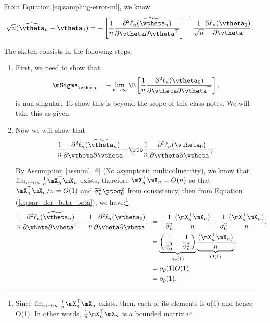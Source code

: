 \documentclass[english,12pt]{book}\usepackage[]{graphicx}\usepackage[]{xcolor}
\begin{document}
\begin{subappendices}
From Equation \eqref{eq:sampling-error-ml}, we know
\begin{equation*}
  \sqrt{n}(\widehat{\vtheta}_n - \vtheta_0) = - \left[\frac{1}{n}\frac{\partial^2 \ell_n(\widetilde{\vtheta}_n)}{\partial \vtheta \partial \vtheta^\top}\right]^{-1}\frac{1}{\sqrt{n}}\frac{\partial \ell_n(\vtheta_0)}{\partial \vtheta}.
\end{equation*}

The sketch consists in the following steps: 
\begin{enumerate}
  \item First, we need to show that:
    \begin{equation*}
    \mSigma_{\vtheta} = - \lim_{n\to\infty} \E\left[\frac{1}{n}\frac{\partial^2 \ell_n(\vtheta_0)}{\partial \vtheta \partial \vtheta^\top}\right],
    \end{equation*}
    is non-singular. To show this is beyond the scope of this class notes. We will take this as given. 
  \item Now we will show that 
   \begin{equation*}
    \frac{1}{n}\frac{\partial^2 \ell_n(\widetilde{\vtheta}_n)}{\partial \vtheta \partial \vtheta^\top}\pto \frac{1}{n}\frac{\partial^2 \ell_n(\vtheta_0)}{\partial \vtheta \partial \vtheta^\top}
   \end{equation*}
   
   By Assumption \ref{assu:ml_6} (No asymptotic multicolinearity), we know that  $\lim_{n\to\infty}\frac{1}{n}\mX_n^\top\mX_n$ exists, therefore $\mX_n^\top\mX_n = O(n)$ so that $\mX_n^\top\mX_n/n = O(1)$ and $\widetilde{\sigma}^2_n\pto \sigma_0^2$ from consistency, then from Equation (\ref{eq:sar_der_beta_beta}), we have:\footnote{Since $\lim_{n\to\infty}\frac{1}{n}\mX_n^\top\mX_n$ exists, then, each of its elements is o(1) and hence O(1). In other words, $\frac{1}{n}\mX_n^\top\mX_n$ is a bounded matrix.} 
   \begin{equation*}
    \begin{aligned}
    \frac{1}{n}\frac{\partial^2 \ell_n(\widetilde{\vtheta}_n)}{\partial \vbeta \partial \vbeta^\top} - \frac{1}{n}\frac{\partial^2 \ell_n(\vtheta_0)}{\partial \vbeta \partial \vbeta^\top} & = - \frac{1}{\widetilde{\sigma}^2_n}\frac{(\mX^\top_n \mX_n)}{n} + \frac{1}{\sigma^2_0}\frac{(\mX^\top_n \mX_n)}{n}, \\
    & = \underbrace{\left(\frac{1}{\sigma^2_0} - \frac{1}{\widetilde{\sigma}^2_n}\right)}_{o_p(1)}\underbrace{\frac{(\mX^\top_n \mX_n)}{n}}_{O(1)}, \\
    & = o_p(1)O(1),  \\
    & = o_p(1).
    \end{aligned}
   \end{equation*}
   

\end{enumerate}
\end{subappendices}
\end{document}
